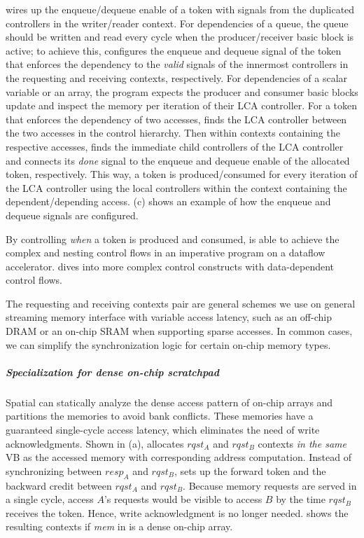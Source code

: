 \name wires up the enqueue/dequeue enable of a token with signals from the duplicated controllers 
in the writer/reader context.
For dependencies of a queue, 
the queue should be written and read every cycle when the producer/receiver basic block is active; 
to achieve this, \name configures the enqueue and dequeue signal of the token that enforces the
dependency to the \emph{valid} signals of the innermost controllers in the requesting and receiving
contexts, respectively.
For dependencies of a scalar variable or an array, the program expects the producer and consumer
basic blocks update and inspect the memory per iteration of their LCA controller.
For a token that enforces the dependency of two accesses, 
\name finds the LCA controller between the two accesses in the control hierarchy.
Then within contexts containing the respective accesses, \name finds the immediate child controllers
of the LCA controller and connects its \emph{done} signal to the enqueue and dequeue enable of the allocated
token, respectively.
This way, a token is produced/consumed for every iteration of the LCA controller using the local
controllers within the context containing the dependent/depending access.
 (c) shows an example of how the enqueue and dequeue signals are configured.

By controlling \emph{when} a token is produced and consumed, \name is able to achieve the complex
and nesting control flows in an imperative program on a dataflow accelerator.
 dives into more complex control constructs with 
data-dependent control flows.

The requesting and receiving contexts pair are general schemes we use on general streaming memory
interface with variable access latency, such as an off-chip DRAM or an on-chip SRAM when supporting 
sparse accesses.
In common cases, we can simplify the synchronization logic for certain on-chip memory types.

\subparagraph{Specialization for dense on-chip scratchpad}
Spatial can statically analyze the dense access pattern of on-chip arrays and partitions the memories
to avoid bank conflicts. These memories have a guaranteed single-cycle access latency, 
which eliminates the need of write acknowledgments.
Shown in  (a),
\name allocates $rqst_A$ and $rqst_B$ contexts \emph{in the same} VB as the accessed memory with
corresponding address computation.
Instead of synchronizing between $resp_A$ and $rqst_B$, \name sets up the forward token and the
backward credit between $rqst_A$ and $rqst_B$.
Because memory requests are served in a single cycle, access $A$'s requests would be visible to
access $B$ by the time $rqst_B$ receives the token. Hence, write acknowledgment is no longer needed.
 shows the resulting contexts if \emph{mem} in  is a dense
on-chip array.

